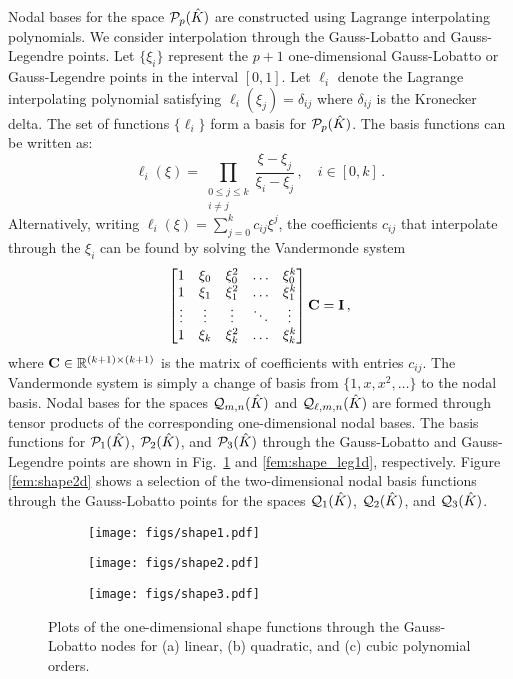 \documentclass[../doc.tex]{subfiles}
\begin{document}
Nodal bases for the space $\mathcal{P}_{p}(\hat{K})$ are constructed using Lagrange interpolating polynomials. We consider interpolation through the Gauss-Lobatto and Gauss-Legendre points. Let $\{\xi_i\}$ represent the $p+1$ one-dimensional Gauss-Lobatto or Gauss-Legendre points in the interval $[0,1]$. Let $\ell_i$ denote the Lagrange interpolating polynomial satisfying $\ell_i(\xi_j) = \delta_{ij}$ where $\delta_{ij}$ is the Kronecker delta. The set of functions $\{\ell_i\}$ form a basis for $\mathcal{P}_{p}(\hat{K})$. The basis functions can be written as:  
	\begin{equation}
		\ell_i(\xi) = \prod_{\substack{0\leq j \leq k\\i\neq j}} \frac{\xi - \xi_j}{\xi_i - \xi_j} \,, \quad i \in [0,k] \,. 
	\end{equation}
Alternatively, writing $\ell_i(\xi) = \sum_{j=0}^k c_{ij} \xi^j$, the coefficients $c_{ij}$ that interpolate through the $\xi_i$ can be found by solving the Vandermonde system 
	\begin{equation}
		\begin{bmatrix} 
			1 & \xi_0 & \xi_0^2 & \ldots & \xi_0^k \\
			1 & \xi_{1} & \xi_{1}^2 & \ldots & \xi_{1}^k \\
			\vdots & \vdots & \vdots & \ddots & \vdots \\
			1 & \xi_{k} & \xi_{k}^2 & \ldots & \xi_{k}^k 
		\end{bmatrix}
		\boldsymbol{\mathrm{C}} = \boldsymbol{\mathrm{I}} \,,
	\end{equation}
where $\boldsymbol{\mathrm{C}} \in \mathbb{R}^{(k+1)\times(k+1)}$ is the matrix of coefficients with entries $c_{ij}$. The Vandermonde system is simply a change of basis from $\{1,x,x^2,\ldots\}$ to the nodal basis. Nodal bases for the spaces $\mathcal{Q}_{m,n}(\hat{K})$ and $\mathcal{Q}_{\ell,m,n}(\hat{K})$ are formed through tensor products of the corresponding one-dimensional nodal bases.
The basis functions for $\mathcal{P}_{1}(\hat{K})$, $\mathcal{P}_{2}(\hat{K})$, and $\mathcal{P}_{3}(\hat{K})$ through the Gauss-Lobatto and Gauss-Legendre points are shown in Fig.~\ref{fem:shape1d} and \ref{fem:shape_leg1d}, respectively.  Figure \ref{fem:shape2d} shows a selection of the two-dimensional nodal basis functions through the Gauss-Lobatto points for the spaces $\mathcal{Q}_{1}(\hat{K})$, $\mathcal{Q}_{2}(\hat{K})$, and $\mathcal{Q}_{3}(\hat{K})$. 
\begin{figure}
\centering
\begin{subfigure}{.30\textwidth}
	\centering
	\texttt{[image: figs/shape1.pdf]}
	\caption{}
\end{subfigure}
\begin{subfigure}{.30\textwidth}
	\centering
	\texttt{[image: figs/shape2.pdf]}
	\caption{}
\end{subfigure}
\begin{subfigure}{.30\textwidth}
	\centering
	\texttt{[image: figs/shape3.pdf]}
	\caption{}
\end{subfigure}
\caption{Plots of the one-dimensional shape functions through the Gauss-Lobatto nodes for (a) linear, (b) quadratic, and (c) cubic polynomial orders.}
\label{fem:shape1d}
\end{figure}
\end{document}
